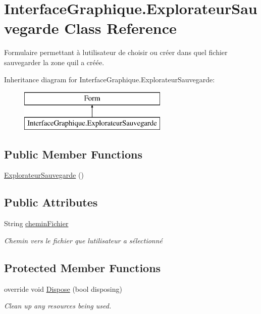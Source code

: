 \hypertarget{class_interface_graphique_1_1_explorateur_sauvegarde}{}\section{Interface\+Graphique.\+Explorateur\+Sauvegarde Class Reference}
\label{class_interface_graphique_1_1_explorateur_sauvegarde}


Formulaire permettant à l\textquotesingle{}utilisateur de choisir ou créer dans quel fichier sauvegarder la zone qu\textquotesingle{}il a créée.  


Inheritance diagram for Interface\+Graphique.\+Explorateur\+Sauvegarde\+:\begin{figure}[H]
\begin{center}
\leavevmode
\includegraphics[height=2.000000cm]{class_interface_graphique_1_1_explorateur_sauvegarde}
\end{center}
\end{figure}
\subsection*{Public Member Functions}
\begin{DoxyCompactItemize}
\item 
\hyperlink{class_interface_graphique_1_1_explorateur_sauvegarde_aa99675f3c4c62c4f2d73dd919c38ceb6}{Explorateur\+Sauvegarde} ()
\end{DoxyCompactItemize}
\subsection*{Public Attributes}
\begin{DoxyCompactItemize}
\item 
String \hyperlink{class_interface_graphique_1_1_explorateur_sauvegarde_a26064d4364197660043ffa2016318273}{chemin\+Fichier}
\begin{DoxyCompactList}\small\item\em Chemin vers le fichier que l\textquotesingle{}utilisateur a sélectionné \end{DoxyCompactList}\end{DoxyCompactItemize}
\subsection*{Protected Member Functions}
\begin{DoxyCompactItemize}
\item 
override void \hyperlink{class_interface_graphique_1_1_explorateur_sauvegarde_a8bd0e83efca364be374e3ed7935ef46c}{Dispose} (bool disposing)
\begin{DoxyCompactList}\small\item\em Clean up any resources being used. \end{DoxyCompactList}\end{DoxyCompactItemize}


